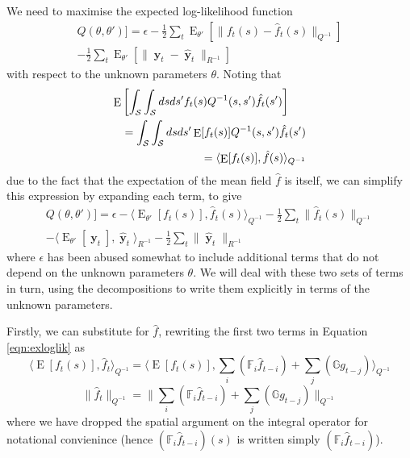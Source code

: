 \documentclass{IEEEtran}
\newcommand{\inner}[3]{\langle#1,#2\rangle_{#3}}
\newcommand{\dist}[2]{\|#1\|_{#2}}
\DeclareMathOperator{\E}{E}
\DeclareMathOperator{\yvec}{\mathbf{y}}
\begin{document}
We need to maximise the expected log-likelihood function
\begin{equation}
	\label{eqn:exploglik}
	\begin{split}
	Q(\theta,\theta')] = \epsilon - \frac{1}{2}\sum_t\E_{\theta'}[\dist{f_t(s) - \hat{f}_t(s)}{Q^{-1}}]  \\
	- \frac{1}{2}\sum_t\E_{\theta'}[\dist{\yvec_t-\hat{\yvec}_t}{R^{-1}}]
	\end{split}
\end{equation}
with respect to the unknown parameters $\theta$. Noting that 
\begin{eqnarray}
	\lefteqn{\E\left[\int_\mathcal{S}\int_\mathcal{S}ds ds' f_t(s) Q^{-1}(s,s') \hat{f}_t(s')\right] } \nonumber \\ 
		&& = \int_\mathcal{S}\int_\mathcal{S}ds ds' \E[f_t(s)] Q^{-1}(s,s') \hat{f}_t(s') \\
		&& = \inner{\E[f_t(s)]}{\hat{f}(s)}{Q^{-1}}
\end{eqnarray}
due to the fact that the expectation of the mean field $\hat{f}$ is itself, we can simplify this expression by expanding each term, to give
\begin{equation}
	\begin{split}
	\label{eqn:exloglik}
	Q(\theta,\theta')] = \epsilon
	- \inner{\E_{\theta'}[f_t(s)]}{\hat{f}_t(s)}{Q^{-1}}
	- \frac{1}{2}\sum_t \dist{\hat{f}_t(s)}{Q^{-1}} \\
	- \inner{\E_{\theta'}[\yvec_t]}{\hat{\yvec}_t}{R^{-1}}
	- \frac{1}{2}\sum_t \dist{\hat{\yvec}_t}{R^{-1}}
	\end{split}
\end{equation}
where $\epsilon$ has been abused somewhat to include additional terms that do not depend on the unknown parameters $\theta$. We will deal with these two sets of terms in turn, using the decompositions to write them explicitly in terms of the unknown parameters.

Firstly, we can substitute for $\hat{f}$, rewriting the first two terms in Equation \ref{eqn:exloglik} as
\begin{equation}
	\label{eqn:Eff}
	\inner{\E[f_t(s)]}{\hat{f}_t}{Q^{-1}} = \inner{\E[f_t(s)]}{\sum_i(\mathbb{F}_i\hat{f}_{t-i}) + \sum_j(\mathbb{G}g_{t-j})}{Q^{-1}}
\end{equation}
\begin{equation}
	\label{eqn:fhat}
	\dist{\hat{f}_t}{Q^{-1}} = \dist{\sum_i(\mathbb{F}_i\hat{f}_{t-i}) + \sum_j(\mathbb{G}g_{t-j})}{Q^{-1}}
\end{equation}
where we have dropped the spatial argument on the integral operator for notational convienince (hence $(\mathbb{F}_i\hat{f}_{t-i})(s)$ is written simply $(\mathbb{F}_i\hat{f}_{t-i})$). 
\end{document}
